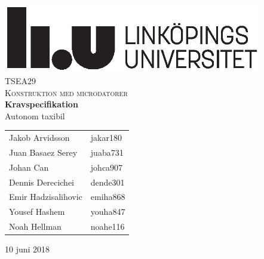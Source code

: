 \documentclass[kravspec/krav.tex]{subfiles}
\begin{document}
\thispagestyle{empty}
\begin{center}
    \includegraphics[height=3cm]{img/liu.eps}\\[1.5cm]

    \textsc{\Large TSEA29}\\[1.5cm]
    \textsc{\large Konstruktion med microdatorer}\\[2.5cm]
    
    { \huge \bfseries Kravspecifikation}\\[0.6cm]
    { \LARGE Autonom taxibil}\\[2.5cm]


    \begin{tabular}{ll}
        \sc Jakob Arvidsson     & jakar180 \\
        \sc Juan Basaez Serey   & juaba731 \\
        \sc Johan Can           & johca907 \\
        \sc Dennis Derecichei   & dende301 \\
        \sc Emir Hadzisalihovic & emiha868 \\
        \sc Yousef Hashem       & youha847 \\
        \sc Noah Hellman        & noahe116 \\
    \end{tabular}
    \vspace{2cm}

    {\large 10 juni 2018}\\[4cm] %
\end{center}
\newpage
\end{document}
